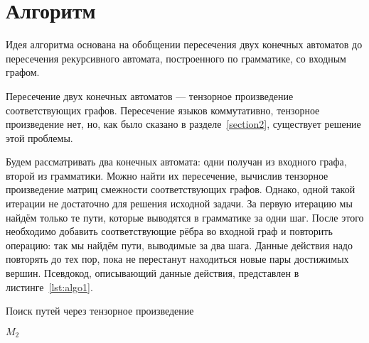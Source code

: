 \section{Алгоритм}

Идея алгоритма основана на обобщении пересечения двух конечных автоматов до пересечения рекурсивного автомата, построенного по грамматике, со входным графом.

Пересечение двух конечных автоматов --- тензорное произведение соответствующих графов.
Пересечение языков коммутативно, тензорное произведение нет, но, как было сказано в разделе~\ref{section2}, существует решение этой проблемы.

Будем рассматривать два конечных автомата: одни получан из входного графа, второй из грамматики.
Можно найти их пересечение, вычислив тензорное произведение матриц смежности соответствующих графов.
Однако, одной такой итерации не достаточно для решения исходной задачи. За первую итерацию мы найдём только те пути, которые выводятся в грамматике за одни шаг. После этого необходимо добавить соответствующие рёбра во входной граф и повторить операцию: так мы найдём пути, выводимые за два шага. Данные действия надо повторять до тех пор, пока не перестанут находиться новые пары достижимых вершин.
Псевдокод, описывающий данные действия, представлен в листинге~\ref{lst:algo1}.

\begin{algorithm}
\begin{algorithmic}[1]
\caption{Поиск путей через тензорное произведение}
\label{lst:algo1}
       \EndIf
    \EndFor
                    \EndIf
                \EndIf
           \EndFor
        \EndFor
    \EndWhile
\State \Return $M_2$
\EndFunction
\end{algorithmic}
\end{algorithm}


